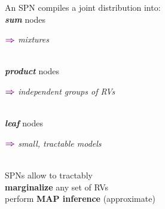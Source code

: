 \documentclass[xcolor={usenames,dvipsnames,svgnames}, compress, aspectratio=169, 11pt]{beamer}
\newcommand{\comment}[3][\small]{\begin{minipage}{1\linewidth}
          \raggedleft
          {
            $\color{violet}\boldsymbol\Rightarrow$
            #1
            {\emph{#2}}
          }
      \end{minipage}#3\\
}
\begin{document}
\begin{frame}[t, htt=bgrey2]
    
    
    
  \hfill\begin{minipage}[t]{0.65\linewidth}
    \vspace{-120pt}
    \raggedright
    An SPN compiles a joint distribution into:\\[4pt]
    \emph{\textbf{sum}} nodes \hspace{-167pt}\comment[\small]{mixtures}{}
    \emph{\textbf{product}} nodes \hspace{-120pt}\comment[\small]{independent groups of RVs}{}
    \emph{\textbf{leaf}} nodes\hspace{-115pt}
    \comment[\small]{small, tractable models}{}
    \vspace{20pt}
    SPNs allow to tractably\\[4pt]
    \textbf{marginalize} any set of RVs\\    
    perform \textbf{MAP inference} (approximate)
  \end{minipage}
\end{frame}
\end{document}
